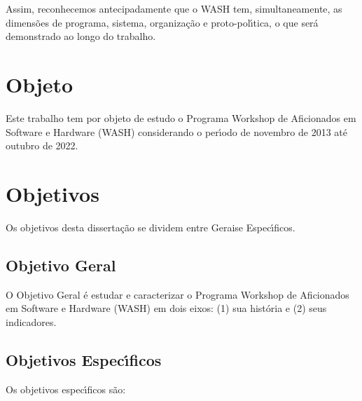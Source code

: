 \documentclass[
12pt,		%
openright,	%
twoside,  %
a4paper,			%
chapter=TITLE,		%
english,			%
french,				%
spanish,			%
brazil				%
]{USPSC-classe/USPSC}
\begin{document}
Assim, reconhecemos antecipadamente que o WASH tem, simultaneamente, as dimens\~oes de programa, sistema, organiza\c{c}\~ao e proto-pol\'{\i}tica, o que ser\'a demonstrado ao longo do trabalho.










\section[Objeto]{Objeto}\label{Objeto}
Este trabalho tem por objeto de estudo o Programa Workshop de Aficionados em Software e Hardware (WASH) considerando o per\'{\i}odo de  novembro de 2013 at\'e outubro de 2022.










\section[Objetivos]{Objetivos}\label{Objetivos}
Os objetivos desta disserta\c{c}\~ao se dividem entre \textquotedbl Gerais\textquotedbl  e \textquotedbl Espec\'{\i}ficos\textquotedbl .










\subsection[Objetivo Geral]{Objetivo Geral}\label{Objetivo Geral}
O Objetivo Geral \'e estudar e caracterizar o Programa Workshop de Aficionados em Software e Hardware (WASH) em dois eixos: (1) sua hist\'oria e (2) seus indicadores.










\subsection[Objetivos Espec\'{\i}ficos]{Objetivos Espec\'{\i}ficos}\label{Objetivos Espec\'{\i}ficos}
Os objetivos espec\'{\i}ficos s\~ao:
\end{document}

